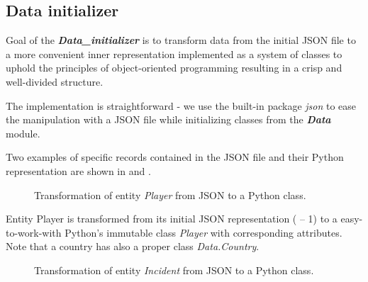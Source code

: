 \subsection{Data initializer}\label{subsection: di}
Goal of the \textbf{\textit{Data\_initializer}} is to transform data from the initial JSON file to a more convenient inner representation implemented as a system of classes to uphold the principles of object-oriented programming resulting in a crisp and well-divided structure.

The implementation is straightforward - we use the built-in package \emph{json} to ease the manipulation with a JSON file while initializing classes from the \textbf{\textit{Data}} module. 

Two examples of specific records contained in the JSON file and their Python representation are shown in  and . 

\begin{figure}[h]
	\caption{Transformation of entity \emph{Player} from JSON to a Python class.}
	\label{fig:player}
\end{figure}

Entity {Player} is transformed from its initial JSON representation ( -- 1) to a easy-to-work-with Python's immutable class \emph{Player} with corresponding attributes. Note that a country has also a proper class \emph{Data.Country}.

\begin{figure}[h]
	\caption{Transformation of entity \emph{Incident} from JSON to a Python class.}
	\label{fig:incident}
\end{figure} 

